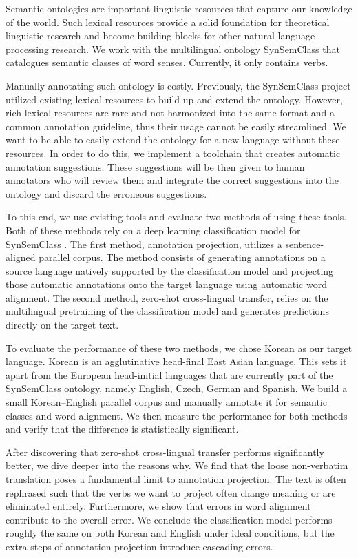 

Semantic ontologies are important linguistic resources that capture our knowledge of the world. Such lexical resources provide a solid foundation for theoretical linguistic research and become building blocks for other natural language processing research. We work with the multilingual ontology SynSemClass \parencite{uresova-etal-2020-synsemclass} that catalogues semantic classes of word senses. Currently, it only contains verbs.

Manually annotating such ontology is costly. Previously, the SynSemClass project utilized existing lexical resources to build up and extend the ontology. However, rich lexical resources are rare and not harmonized into the same format and a common annotation guideline, thus their usage cannot be easily streamlined. We want to be able to easily extend the ontology for a new language without these resources. In order to do this, we implement a toolchain that creates automatic annotation suggestions. These suggestions will be then given to human annotators who will review them and integrate the correct suggestions into the ontology and discard the erroneous suggestions.

To this end, we use existing tools and evaluate two methods of using these tools. Both of these methods rely on a deep learning classification model for SynSemClass \parencite{SSC_LLM_Suggestions}. The first method, annotation projection, utilizes a sentence-aligned parallel corpus. The method consists of generating annotations on a source language natively supported by the classification model and projecting those automatic annotations onto the target language using automatic word alignment. The second method, zero-shot cross-lingual transfer, relies on the multilingual pretraining of the classification model and generates predictions directly on the target text.

To evaluate the performance of these two methods, we chose Korean as our target language. Korean is an agglutinative head-final East Asian language. This sets it apart from the European head-initial languages that are currently part of the SynSemClass ontology, namely English, Czech, German and Spanish. We build a small Korean--English parallel corpus and manually annotate it for semantic classes and word alignment. We then measure the performance for both methods and verify that the difference is statistically significant.

After discovering that zero-shot cross-lingual transfer performs significantly better, we dive deeper into the reasons why. We find that the loose non-verbatim translation poses a fundamental limit to annotation projection. The text is often rephrased such that the verbs we want to project often change meaning or are eliminated entirely. Furthermore, we show that errors in word alignment contribute to the overall error. We conclude the classification model performs roughly the same on both Korean and English under ideal conditions, but the extra steps of annotation projection introduce cascading errors. 

